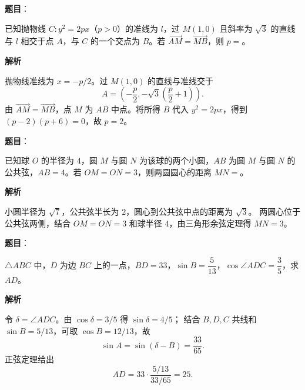 \begin{answer}

\textbf{题目}：

已知抛物线 $C:y^2=2px$（$p>0$）的准线为 $l$，过 $M(1,0)$ 且斜率为 $\sqrt3$ 的直线与 $l$ 相交于点 $A$，与 $C$ 的一个交点为 $B$。若 $\overrightarrow{AM}=\overrightarrow{MB}$，则 $p=$\gkblank{}。

\textbf{解析}

抛物线准线为 $x=-p/2$。过 $M(1,0)$ 的直线与准线交于
\nopagebreak[4]
\[
A=\left(-\frac p2,-\sqrt3\left(\frac p2+1\right)\right).
\]
由 $\overrightarrow{AM}=\overrightarrow{MB}$，点 $M$ 为 $AB$ 中点。将所得 $B$ 代入
$y^2=2px$，得到 $(p-2)(p+6)=0$，故 $p=2$。


\end{answer}
\begin{answer}

\textbf{题目}：

已知球 $O$ 的半径为 $4$，圆 $M$ 与圆 $N$ 为该球的两个小圆，$AB$ 为圆 $M$ 与圆 $N$ 的公共弦，$AB=4$。若 $OM=ON=3$，则两圆圆心的距离 $MN=$\gkblank{}。

\textbf{解析}

小圆半径为 $\sqrt7$，公共弦半长为 $2$，圆心到公共弦中点的距离为 $\sqrt3$。
两圆心位于公共弦两侧，结合 $OM=ON=3$ 和球半径 $4$，由三角形余弦定理得
$MN=3$。


\end{answer}
\begin{answer}

\textbf{题目}：

$\triangle ABC$ 中，$D$ 为边 $BC$ 上的一点，$BD=33$，$\sin B=\dfrac5{13}$，$\cos\angle ADC=\dfrac35$，求 $AD$。

\textbf{解析}

令 $\delta=\angle ADC$。由 $\cos\delta=3/5$ 得 $\sin\delta=4/5$；
结合 $B,D,C$ 共线和 $\sin B=5/13$，可取 $\cos B=12/13$，故
\nopagebreak[4]
\[
\sin A=\sin(\delta-B)=\frac{33}{65}.
\]
正弦定理给出
\nopagebreak[4]
\[
AD=33\cdot\frac{5/13}{33/65}=25.
\]


\end{answer}
